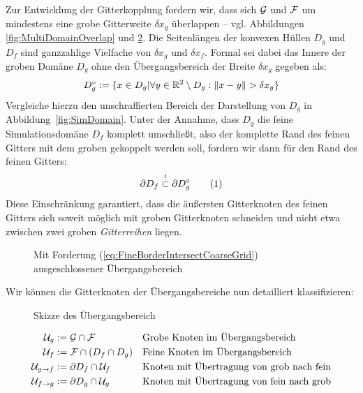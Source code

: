 Zur Entwicklung der Gitterkopplung fordern wir, dass sich \(\mathcal{G}\) und \(\mathcal{F}\) um mindestens eine grobe Gitterweite \(\delta x_g\) überlappen -- vgl. Abbildungen \ref{fig:MultiDomainOverlap} und \ref{fig:OverlapZone}. Die Seitenlängen der konvexen Hüllen \(D_g\) und \(D_f\) sind ganzzahlige Vielfache von \(\delta x_g\) und \(\delta x_f\). Formal sei dabei das Innere der groben Domäne \(D_g\) ohne den Übergangsbereich der Breite \(\delta x_g\) gegeben als:
\[ D_g^\circ := \{ x \in D_g | \forall y \in \mathbb{R}^2 \setminus D_g : \|x-y\| > \delta x_g \} \]
Vergleiche hierzu den unschraffierten Bereich der Darstellung von \(D_g\) in Abbildung~\ref{fig:SimDomain}.
Unter der Annahme, dass \(D_g\) die feine Simulationsdomäne \(D_f\) komplett umschließt, also der komplette Rand des feinen Gitters mit dem groben gekoppelt werden soll, fordern wir dann für den Rand des feinen Gitters:
\[ \partial D_f \stackrel{!}{\subset} \partial D_g^\circ \numberthis\label{eq:FineBorderIntersectCoarseGrid} \]
Diese Einschränkung garantiert, dass die äußersten Gitterknoten des feinen Gitters sich soweit möglich mit groben Gitterknoten schneiden und nicht etwa zwischen zwei groben \emph{Gitterreihen} liegen.

\begin{figure}[h]
\centering

\caption{Mit Forderung (\ref{eq:FineBorderIntersectCoarseGrid}) ausgeschlossener Übergangsbereich \cite[vgl. Abb.~9]{Lagrava12}}
\label{fig:InvalidOverlapArea}
\end{figure}

\noindent
Wir können die Gitterknoten der Übergangsbereiche nun detailliert klassifizieren:

\begin{figure}[h]
\centering

\caption{Skizze des Übergangsbereich \cite[vgl.~Abb.~4]{Lagrava12}}
\label{fig:OverlapZone}
\end{figure}

\begin{Definition}
\label{def:OverlapGridNodes}
\begin{align*}
\mathcal{U}_g &:= \mathcal{G} \cap \mathcal{F} && \text{Grobe Knoten im Übergangsbereich} \\
\mathcal{U}_f &:= \mathcal{F} \cap (D_f \cap D_g) && \text{Feine Knoten im Übergangsbereich} \\
\mathcal{U}_{g \to f} &:= \partial D_f \cap \mathcal{U}_f && \text{Knoten mit Übertragung von grob nach fein} \\
\mathcal{U}_{f \to g} &:= \partial D_g \cap \mathcal{U}_g && \text{Knoten mit Übertragung von fein nach grob}
\end{align*}
\end{Definition}

